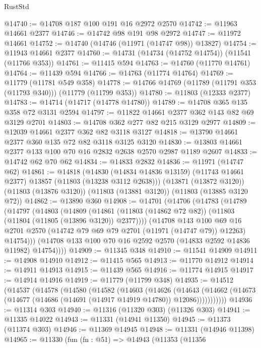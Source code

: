 \begin{lexlean}{RustStd}
\begin{coremodule}
@14740 := @14708 @187 @100 @191 @16 @2972 @2570
@14742 := @11963 @14661 @2377
@14746 := @14742 @98 @191 @98 @2972
@14747 := @11972 @14661
@14752 := @14740 (@14746 (@11971 (@14747 @98)) @13827)
@14754 := @11943 @14661 @2377
@14760 := @14731 (@14734 (@14752 @14754)) (@11541 (@11766 @353))
@14761 := @11415 @594
@14763 := @14760 (@11770 @14761)
@14764 := @11439 @594
@14766 := @14763 (@11774 @14764)
@14769 := @11779 (@11781 @549 @358)
@14778 := @14766 @14769 (@11789 (@11791 @353 (@11793 @340))) (@11779 (@11799 @353))
@14780 := @11803 (@12333 @2377)
@14783 := @14714 (@14717 (@14778 @14780))
@14789 := @14708 @365 @135 @358 @72 @3131 @2594
@14797 := @11822 @14661 @2377 @362 @143 @82 @69 @3129 @2701
@14803 := @14708 @362 @277 @82 @215 @3129 @2977
@14809 := @12039 @14661 @2377 @362 @82 @3118 @3127
@14818 := @13790 @14661 @2377 @360 @135 @72 @82 @3118 @3125 @3120
@14830 := @13803 @14661 @2377 @133 @100 @70 @16 @2832 @2638 @2570 @2987 @1189 @2607
@14833 := @14742 @62 @70 @62
@14834 := @14833 @2832
@14836 := @11971 (@14747 @62)
@14861 := @14818
    (@14830 (@14834 @14836 @13159) (@11743 @14661 @2377) @13857 (@11803 (@13238 @3112 @2638)))
    (@13871 (@13872 @3120))
    (@11803 (@13876 @3120))
    (@11803 (@13881 @3120))
    (@11803 (@13885 @3120 @72))
@14862 := @13890 @360
@14908 := @14701
    (@14706
      (@14783
        (@14789
          (@14797
            (@14803
              (@14809
                (@14861 (@11803 (@14862 @72 @82)) (@11803 (@11804 (@11805 (@13896 @3120)) @2377))))
              (@14708
                @143
                @100
                @69
                @16
                @2701
                @2570
                (@14742 @79 @69 @79 @2701 (@11971 (@14747 @79)) @12263)
                @14754)))
          (@14708 @133 @100 @70 @16 @2592 @2570 (@14833 @2592 @14836 @11982) @14754))))
@14909 := @11345 @348
@14910 := @11541 @14909
@14911 := @14908 @14910
@14912 := @11415 @565
@14913 := @11770 @14912
@14914 := @14911 @14913
@14915 := @11439 @565
@14916 := @11774 @14915
@14917 := @14914 @14916
@14919 := @11779 (@11799 @348)
@14935 := @14512
    (@14537
      (@14578
        (@14580
          (@14582
            (@14603
              (@14626
                (@14643
                  (@14662 (@14673 (@14677 (@14686 (@14691 (@14917 @14919 @14780)) @12086)))))))))))
@14936 := @11314 @303
@14940 := @11316 (@11320 @303) (@11326 @303)
@14941 := @11335 @14022
@14943 := @11331 (@14941 @11350)
@14945 := @11373 (@11374 @303)
@14946 := @11369 @14945
@14948 := @11331 (@14946 @11398)
@14965 := @11330
    (fun (fn : @51) =>
    @14943
      (@11353
        (@11356

\end{coremodule}
\end{lexlean}
